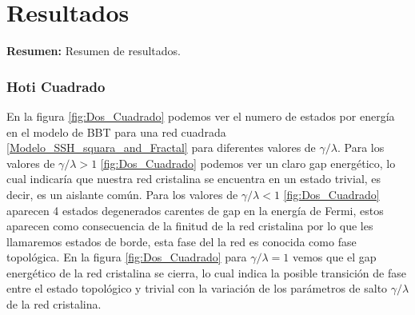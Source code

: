 \chapter{Resultados}

\begin{center}
\begin{minipage}{0.9\textwidth}
{\small
{\bf Resumen:} Resumen de resultados.
}
\end{minipage}
\end{center}



\subsection{Hoti Cuadrado}

En la figura \ref{fig:Dos_Cuadrado} podemos ver el numero de estados por energía en el modelo de BBT para una red cuadrada \ref{Modelo_SSH_squara_and_Fractal} para diferentes valores de $\gamma/\lambda$. Para los valores de $\gamma/\lambda>1$ \ref{fig:Dos_Cuadrado}  podemos ver un claro gap energético, lo cual indicaría que nuestra red cristalina se encuentra en un estado trivial, es decir, es un aislante común. Para los valores de $\gamma/\lambda<1$ \ref{fig:Dos_Cuadrado}  aparecen 4 estados degenerados carentes de gap en la energía de Fermi, estos aparecen como consecuencia de la finitud de la red cristalina por lo que les llamaremos estados de borde, esta fase del la red es conocida como fase topológica. En la figura \ref{fig:Dos_Cuadrado} para   $\gamma/\lambda = 1$ vemos que el gap energético de la red cristalina se cierra, lo cual indica la posible transición de fase entre el estado topológico y trivial con la variación de los parámetros de salto $\gamma/\lambda$ de la red cristalina.






